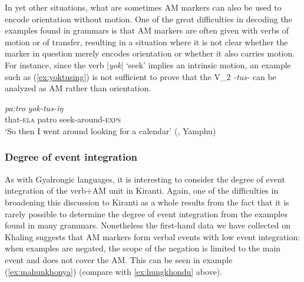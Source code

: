 \documentclass[oneside,a4paper,11pt]{article}
\newcommand{\ipa}[1]{{\phon\textit{#1}}}
\newcommand{\sens}[1]{‘#1’}
\newcommand{\dhatu}[2]{|\ipa{#1}| `#2'}
\begin{document}


In yet other situations, what are sometimes AM markers can also be used to encode orientation without motion.  One of the great difficulties in decoding the examples found in grammars is that AM markers are  often given with verbs of motion or of transfer, resulting in a situation where it is not clear whether the marker in question merely encodes orientation or whether it also carries motion. For instance, since the verb \dhatu{yok}{seek} implies an intrinsic motion, an example such as (\ref{ex:yoktusing}) is not sufficient to prove that the V_2 \ipa{-tus-} can be analyzed as AM rather than orientation.
 
\begin{exe}
\ex \label{ex:yoktusing}
 \gll  \ipa{mo-ba}	\ipa{pa:tro}	\ipa{yok-tus-iŋ} \\
that-\textsc{ela} patro seek-around-\textsc{exps} \\
\glt \sens{So then I went around looking for a calendar} (\citealt[153]{rutgers98yamphu}, Yamphu)
\end{exe}


  
\subsubsection{Degree of event integration} \label{sec:khaling.pluriactionality}

As with Gyalrongic languages, it is interesting to consider the degree of event integration of the verb+AM unit in Kiranti.  Again, one of the difficulties in broadening this discussion to Kiranti as a whole results from the fact that it is rarely possible to determine the degree of event integration from the examples found in many grammars.  Nonetheless the first-hand data we have collected on Khaling suggests that AM markers form verbal events with low event integration: when examples are negated, the scope of the negation is limited to the main event and does not cover the AM. This can be seen in example (\ref{ex:mahunkhonya}) (compare with \ref{ex:hungkhondu} above). 
\end{document}
